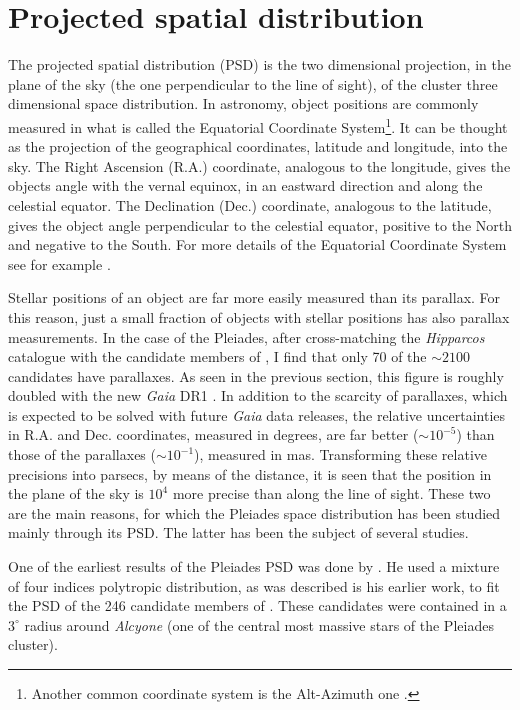 \section{Projected spatial distribution}
\label{sect:PSD}
{The projected spatial distribution (PSD) is the two dimensional projection, in the plane of the sky (the one perpendicular to the line of sight), of the cluster three dimensional space distribution. In astronomy, object positions are commonly measured in what is called the Equatorial Coordinate System\footnote{Another common coordinate system is the Alt-Azimuth one \cite[see][]{Smart1977}.}. It can be thought as the projection of the geographical coordinates, latitude and longitude, into the sky. The Right Ascension (R.A.) coordinate, analogous to the longitude, gives the objects angle with the vernal equinox, in an eastward direction and along the celestial equator. The Declination (Dec.) coordinate, analogous to the latitude, gives the object angle perpendicular to the celestial equator, positive to the North and negative to the South. For more details of the Equatorial Coordinate System see for example \citet{Smart1977}. }

{Stellar positions of an object are far more easily measured than its parallax. For this reason, just a small fraction of objects with stellar positions has also parallax measurements. In the case of the Pleiades, after cross-matching the \emph{Hipparcos} catalogue \citep{1997A&A...323L..49P} with the candidate members of \citet{Bouy2015}, I find that only 70 of the $\sim2100$ candidates have parallaxes. As seen in the previous section, this figure is roughly doubled with the new \emph{Gaia} DR1 \citep{2016A&A...595A...1G}. In addition to the scarcity of parallaxes, which is expected to be solved with future \emph{Gaia} data releases, the relative uncertainties in R.A. and Dec. coordinates, measured in degrees, are far better ($\sim 10^{-5}$) than those of the parallaxes ($\sim10^{-1}$), measured in mas. Transforming these relative precisions into parsecs, by means of the distance, it is seen that the position in the plane of the sky is $10^4$ more precise than along the line of sight.  These two are the main reasons, for which the Pleiades space distribution has been studied mainly through its PSD. The latter has been the subject of several studies. }

One of the earliest results of the Pleiades PSD was done by \citet{Limber1962}. He used a mixture of four indices polytropic distribution, as was described is his earlier \citet{Limber1961} work, to fit the PSD of the 246 candidate members of \citet{Trumpler1921}. These candidates were contained in a $3^{\circ}$ radius around \emph{Alcyone} (one of the central most massive stars of the Pleiades cluster). 

